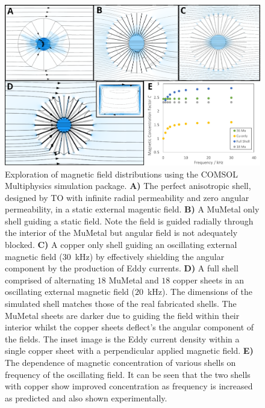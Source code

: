 \documentclass[11pt]{iopart}
\begin{document}
\begin{figure}
  \begin{center}
   \noindent\includegraphics[width=0.89\linewidth]{images/compoundCOMSOL.png}
  \end{center}
  \caption{
    Exploration of magnetic field distributions using the COMSOL
    Multiphysics simulation package.
    \textbf{A)} The perfect anisotropic shell, designed by TO with
    infinite radial permeability and zero angular permeability, in a
    static external magentic field.
    \textbf{B)} A MuMetal only shell guiding a static field. Note the
    field is guided radially through the interior of the MuMetal but
    angular field is not adequately blocked.
    \textbf{C)} A copper only shell guiding an oscillating external
    magnetic field ($30$~kHz) by effectively shielding the angular component by
    the production of Eddy currents.
    \textbf{D)} A full shell comprised of alternating $18$ MuMetal and
    $18$ copper sheets in an oscillating external magnetic field
    ($20$~kHz). The dimensions of the simulated shell matches those of
    the real fabricated shells. The MuMetal sheets are darker due to
    guiding the field within their interior whilst the copper sheets
    deflect's the angular component of the fields.  The inset image is
    the Eddy current density within a single copper sheet with a
    perpendicular applied magnetic field.
    \textbf{E)} The dependence of magnetic concentration of various
    shells on frequency of the oscillating field. It can be seen that
    the two shells with copper show improved concentration as
    frequency is increased as predicted and also shown experimentally.
  }
  \label{fig:COMSOL}
\end{figure}
\end{document}
